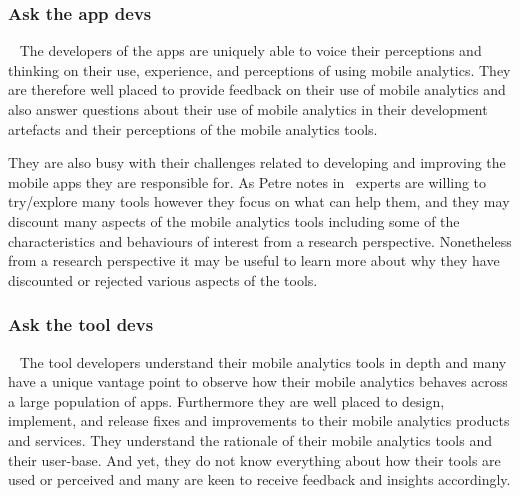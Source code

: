 \label{method-vectored-questions}


\subsubsection{Ask the app devs}~\label{section-ask-the-app-devs-research-method}
The developers of the apps are uniquely able to voice their perceptions and thinking on their use, experience, and perceptions of using mobile analytics. They are therefore well placed to provide feedback on their use of mobile analytics and also answer questions about their use of mobile analytics in their development artefacts and their perceptions of the mobile analytics tools.

They are also busy with their challenges related to developing and improving the mobile apps they are responsible for. As Petre notes in~\citep{petre2009_insights_from_expert_software_design_practice} experts are willing to try/explore many tools however they focus on what can help them, and they may discount many aspects of the mobile analytics tools including some of the characteristics and behaviours of interest from a research perspective. Nonetheless from a research perspective it may be useful to learn more about why they have discounted or rejected various aspects of the tools. 

\subsubsection{Ask the tool devs}~\label{section-ask-the-tool-devs-research-method} 
The tool developers understand their mobile analytics tools in depth and many have a unique vantage point to observe how their mobile analytics behaves across a large population of apps. Furthermore they are well placed to design, implement, and release fixes and improvements to their mobile analytics products and services. They understand the rationale of their mobile analytics tools and their user-base. And yet, they do not know everything about how their tools are used or perceived and many are keen to receive feedback and insights accordingly.

